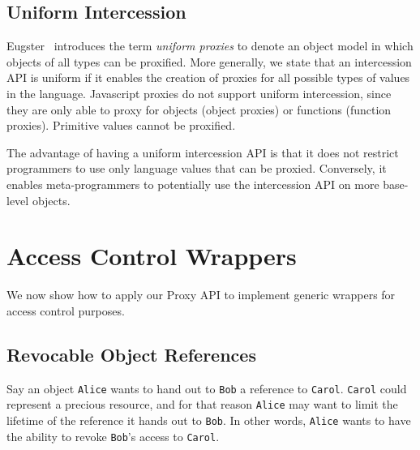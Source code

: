 \documentclass{sig-alternate}
\begin{document}
\subsection{Uniform Intercession}
\label{sub:uniform_intercession}

Eugster~\cite{eugster06uniform} introduces the term \emph{uniform proxies} to denote an object model in which objects of all types can be proxified. More generally, we state that an intercession API is uniform if it enables the creation of proxies for all possible types of values in the language. Javascript proxies do not support uniform intercession, since they are only able to proxy for objects (object proxies) or functions (function proxies). Primitive values cannot be proxified.

The advantage of having a uniform intercession API is that it does not restrict programmers to use only language values that can be proxied. Conversely, it enables meta-programmers to potentially use the intercession API on more base-level objects.


\section{Access Control Wrappers}
\label{sec:examples}

We now show how to apply our Proxy API to implement generic wrappers for access control purposes.

\subsection{Revocable Object References}
\label{sub:revoker}

Say an object \texttt{Alice} wants to hand out to \texttt{Bob} a reference to \texttt{Carol}. \texttt{Carol} could represent a precious resource, and for that reason \texttt{Alice} may want to limit the lifetime of the reference it hands out to \texttt{Bob}. In other words, \texttt{Alice} wants to have the ability to revoke \texttt{Bob}'s access to \texttt{Carol}.
\end{document}
